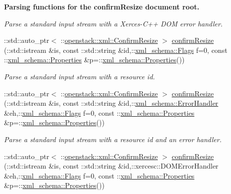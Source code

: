 \begin{Indent}{\bf Parsing functions for the confirmResize document root.}
\begin{DoxyCompactItemize}
\begin{DoxyCompactList}\small\item\em Parse a standard input stream with a Xerces-\/C++ DOM error handler. \item\end{DoxyCompactList}\item 
::std::auto\_\-ptr$<$ ::\hyperlink{classopenstack_1_1xml_1_1ConfirmResize}{openstack::xml::ConfirmResize} $>$ \hyperlink{namespaceopenstack_1_1xml_a555f79fd8cde949426f11b3aca641a24}{confirmResize} (::std::istream \&is, const ::std::string \&id,::\hyperlink{namespacexml__schema_affb4c227cbd9aa7453dd1dc5a1401943}{xml\_\-schema::Flags} f=0, const ::\hyperlink{namespacexml__schema_ad27ce19a7ee1d3b1064092648898f64c}{xml\_\-schema::Properties} \&p=::\hyperlink{namespacexml__schema_ad27ce19a7ee1d3b1064092648898f64c}{xml\_\-schema::Properties}())
\begin{DoxyCompactList}\small\item\em Parse a standard input stream with a resource id. \item\end{DoxyCompactList}\item 
::std::auto\_\-ptr$<$ ::\hyperlink{classopenstack_1_1xml_1_1ConfirmResize}{openstack::xml::ConfirmResize} $>$ \hyperlink{namespaceopenstack_1_1xml_a143cdbff7c4ba8cdfbb27e3f8b41bb49}{confirmResize} (::std::istream \&is, const ::std::string \&id,::\hyperlink{namespacexml__schema_ab1c9361bfd3b404eaabf0c31eded79dc}{xml\_\-schema::ErrorHandler} \&eh,::\hyperlink{namespacexml__schema_affb4c227cbd9aa7453dd1dc5a1401943}{xml\_\-schema::Flags} f=0, const ::\hyperlink{namespacexml__schema_ad27ce19a7ee1d3b1064092648898f64c}{xml\_\-schema::Properties} \&p=::\hyperlink{namespacexml__schema_ad27ce19a7ee1d3b1064092648898f64c}{xml\_\-schema::Properties}())
\begin{DoxyCompactList}\small\item\em Parse a standard input stream with a resource id and an error handler. \item\end{DoxyCompactList}\item 
::std::auto\_\-ptr$<$ ::\hyperlink{classopenstack_1_1xml_1_1ConfirmResize}{openstack::xml::ConfirmResize} $>$ \hyperlink{namespaceopenstack_1_1xml_a1d7ea33e954b9e2ddf0bcae2a47f18bf}{confirmResize} (::std::istream \&is, const ::std::string \&id,::xercesc::DOMErrorHandler \&eh,::\hyperlink{namespacexml__schema_affb4c227cbd9aa7453dd1dc5a1401943}{xml\_\-schema::Flags} f=0, const ::\hyperlink{namespacexml__schema_ad27ce19a7ee1d3b1064092648898f64c}{xml\_\-schema::Properties} \&p=::\hyperlink{namespacexml__schema_ad27ce19a7ee1d3b1064092648898f64c}{xml\_\-schema::Properties}())

\end{DoxyCompactItemize}
\end{Indent}

